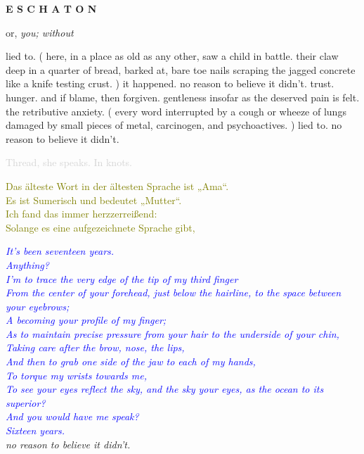 \documentclass[11pt]{article}
\begin{document}
\begingroup
\begin{center}
\huge \textbf{E S C H A T O N}
\end{center}
\endgroup

\begingroup
\begin{center}
or, \textit{you; without}
\end{center}
\endgroup

\vspace*{2\baselineskip}

\begingroup
lied to. ( here, in a place as old as any other, saw a child in battle. their claw deep in a quarter of bread, barked at, bare toe nails scraping the jagged concrete like a knife testing crust. ) it happened. no reason to believe it didn't. trust. hunger. and if blame, then forgiven. gentleness insofar as the deserved pain is felt. the retributive anxiety. ( every word interrupted by a cough or wheeze of lungs damaged by small pieces of metal, carcinogen, and psychoactives. ) lied to. no reason to believe it didn't.
\endgroup

\begingroup
\begin{center}
\textcolor{lightgray}{Thread, she speaks. In knots.}
\rightskip\leftskip
\end{center}
\endgroup

\begingroup
\begin{center}
\textcolor{olive}{Das älteste Wort in der ältesten Sprache ist „Ama“. \\ Es ist Sumerisch und bedeutet „Mutter“. \\ Ich fand das immer herzzerreißend: \\ Solange es eine aufgezeichnete Sprache gibt,}
\end{center}
\endgroup

\begingroup
\begin{center}
\textit{\textcolor{blue}{It's been seventeen years. \\ Anything? \\ I'm to trace the very edge of the tip of my third finger \\ From the center of your forehead, just below the hairline, to the space between your eyebrows; \\ A becoming your profile of my finger; \\ As to maintain precise pressure from your hair to the underside of your chin, \\ Taking care after the brow, nose, the lips, \\ And then to grab one side of the jaw to each of my hands, \\ To torque my wrists towards me, \\ To see your eyes reflect the sky, and the sky your eyes, as the ocean to its superior? \\ And you would have me speak? \\ Sixteen years. } \\ no reason to believe it didn't. }
\end{center}
\endgroup
\end{document}
